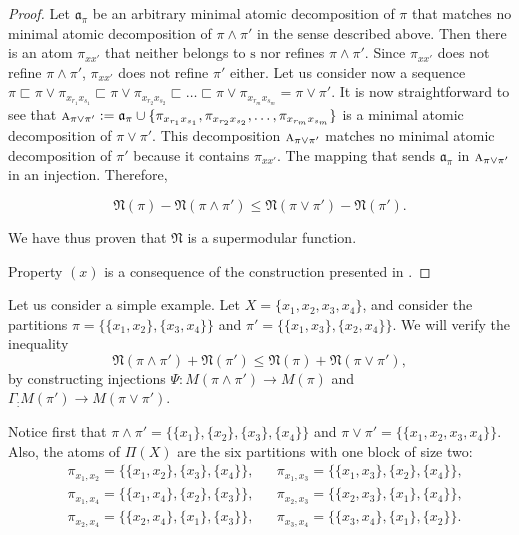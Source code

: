 \documentclass[12pt]{extarticle}
\begin{document}
\begin{proof}
		Let $\mathfrak{a}_{\pi}$ be an arbitrary minimal atomic decomposition of $\pi$ that matches no minimal atomic decomposition of $\pi\wedge\pi'$ in the sense described above. Then there is an atom $\pi_{xx'}$ that  neither  belongs to $\textrm{s}$ nor refines $\pi\wedge \pi'$. Since $\pi_{xx'}$ does not refine $\pi\wedge\pi'$, $\pi_{xx'}$ does not refine $ \pi'$ either. Let us consider now a sequence $\pi\sqsubset\pi\vee\pi_{x_{r_1}x_{s_1}}\sqsubset\pi\vee\pi_{x_{r_2}x_{s_2}}\sqsubset\dots\sqsubset\pi\vee\pi_{x_{r_m}x_{s_m}}=\pi\vee\pi'.$ It is now straightforward to see that $\textsc{a}_{\pi\vee\pi'}:=\mathfrak{a}_{\pi}\cup \{\pi_{x_{r_1}x_{s_1}},\pi_{x_{r_2}x_{s_2}},\ldots,\pi_{x_{r_m}x_{s_m}}\}$ is a minimal atomic decomposition of $\pi\vee\pi'$. This decomposition $\textsc{a}_{\pi\vee\pi'}$ matches no minimal atomic decomposition of $\pi'$ because it contains $\pi_{xx'}$. The mapping that sends $\mathfrak{a}_{\pi}$ in $\textsc{a}_{\pi\vee\pi'}$ in an injection. Therefore,
		
		\begin{equation}\label{supermodularity}
		\mathfrak{N}(\pi) -  \mathfrak{N}(\pi\wedge \pi')\leq \mathfrak{N}(\pi\vee \pi')- \mathfrak{N}(\pi').
		\end{equation}
		
		We have thus proven that $\mathfrak{N}$ is a supermodular function.
		
		Property $(x)$ is a consequence of the construction presented in \cite{LeclercPartitions}.
		
	\end{proof}

Let us consider a simple example. Let \( X = \{x_1, x_2, x_3, x_4\} \), and consider the partitions
\(\pi = \{\{x_1,x_2\}, \{x_3,x_4\}\}\) and \(\pi' = \{\{x_1,x_3\}, \{x_2,x_4\}\}\).
We will verify the inequality
\[\mathfrak{N}(\pi \wedge \pi') + \mathfrak{N}(\pi') \le \mathfrak{N}(\pi) + \mathfrak{N}(\pi \vee \pi'),\]
by constructing injections \(\Psi: M(\pi \wedge \pi') \to M(\pi)\) and \(\Gamma_: M(\pi') \to M(\pi \vee \pi')\).

Notice first that
\(\pi \wedge \pi' = \{\{x_1\},\{x_2\},\{x_3\},\{x_4\}\}\) and \(\pi \vee \pi' = \{\{x_1,x_2,x_3,x_4\}\}\). Also,
the atoms of \( \Pi(X) \) are the six partitions with one block of size two:
\[
\begin{aligned}
&\pi_{x_1,x_2} = \{\{x_1,x_2\},\{x_3\},\{x_4\}\}, 
&&\pi_{x_1,x_3} = \{\{x_1,x_3\},\{x_2\},\{x_4\}\}, \\
&\pi_{x_1,x_4} = \{\{x_1,x_4\},\{x_2\},\{x_3\}\}, 
&&\pi_{x_2,x_3} = \{\{x_2,x_3\},\{x_1\},\{x_4\}\}, \\
&\pi_{x_2,x_4} = \{\{x_2,x_4\},\{x_1\},\{x_3\}\}, 
&&\pi_{x_3,x_4} = \{\{x_3,x_4\},\{x_1\},\{x_2\}\}.
\end{aligned}
\]
\end{document}
